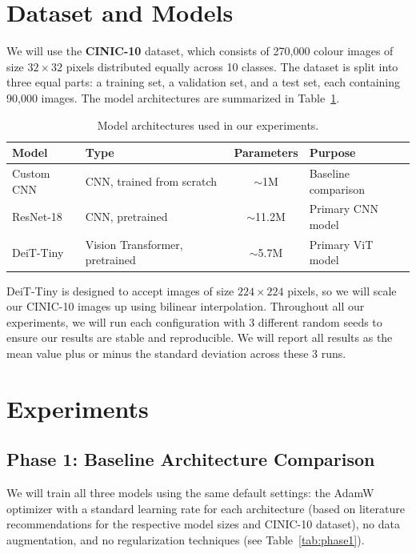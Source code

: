 \documentclass[12pt,a4paper]{article}
\begin{document}
\section{Dataset and Models}

We will use the \textbf{CINIC-10} dataset, which consists of 270,000 colour images of size $32\times32$ pixels distributed equally across 10 classes. The dataset is split into three equal parts: a training set, a validation set, and a test set, each containing 90,000 images. The model architectures are summarized in Table~\ref{tab:models}.

\begin{table}[H]
\centering
\caption{Model architectures used in our experiments.}
\label{tab:models}
\begin{tabular}{@{}llcl@{}}
\toprule
\textbf{Model} & \textbf{Type} & \textbf{Parameters} & \textbf{Purpose} \\
\midrule
Custom CNN & CNN, trained from scratch & $\sim$1M & Baseline comparison \\
ResNet-18 & CNN, pretrained & $\sim$11.2M & Primary CNN model \\
DeiT-Tiny & Vision Transformer, pretrained & $\sim$5.7M & Primary ViT model \\
\bottomrule
\end{tabular}
\end{table}

DeiT-Tiny is designed to accept images of size $224\times224$ pixels, so we will scale our CINIC-10 images up using bilinear interpolation. Throughout all our experiments, we will run each configuration with 3 different random seeds to ensure our results are stable and reproducible. We will report all results as the mean value plus or minus the standard deviation across these 3 runs.

\section{Experiments}

\subsection{Phase 1: Baseline Architecture Comparison}

We will train all three models using the same default settings: the AdamW optimizer with a standard learning rate for each architecture (based on literature recommendations for the respective model sizes and CINIC-10 dataset), no data augmentation, and no regularization techniques (see Table~\ref{tab:phase1}).
\end{document}
